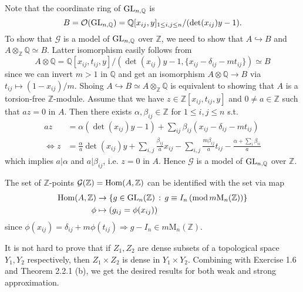 \begin{problem} \notfinish
\end{problem}
\begin{problem} \notfinish
\end{problem}

\begin{problem}
Note that the coordinate ring of $\operatorname{\mathrm{GL}}_{n,\mathbb{Q}}$ is 
$$
B =\mathcal{O}(\operatorname{\mathrm{GL}}_{n, \mathbb{Q}}) = \mathbb{Q}[x_{ij}, y]_{1\leq i,j \leq n} / (\det(x_{ij})y - 1).
$$
To show that $\mathcal{G}$ is a model of $\operatorname{\mathrm{GL}}_{n, \mathbb{Q}}$ over $\mathbb{Z}$, we need to show that
$A \hookrightarrow B$ and $A \otimes_{\mathbb{Z}} \mathbb{Q} \simeq B$.
Latter isomorphism easily follows from 
$$
A \otimes \mathbb{Q} = \mathbb{Q}[x_{ij}, t_{ij}, y] / (\det(x_{ij})y - 1, \{x_{ij} - \delta_{ij} - mt_{ij}\}) \simeq B
$$
since we can invert $m > 1$ in $\mathbb{Q}$ and get an isomorphism $A\otimes\mathbb{Q} \to B$ via $t_{ij} \mapsto (1 - x_{ij})/m$.
Shoing $A \hookrightarrow B \simeq A \otimes_{\mathbb{Z}}\mathbb{Q}$ is equivalent to
showing that $A$ is a torsion-free $\mathbb{Z}$-module.
Assume that we have $z\in \mathbb{Z}[x_{ij}, t_{ij}, y]$ and $0 \neq a\in\mathbb{Z}$
such that $az = 0$ in $A$.
Then there exists $\alpha, \beta_{ij} \in \mathbb{Z}$ for $1 \leq i, j \leq n$ s.t.
\begin{align*}
az &= \alpha(\det(x_{ij})y - 1) + \sum_{ij}\beta_{ij}(x_{ij} - \delta_{ij} - mt_{ij}) \\
\Leftrightarrow z &= \frac{\alpha}{a} \det(x_{ij})y + \sum_{i, j} \frac{\beta_{ij}}{a}x_{ij} - \sum_{i, j} \frac{m\beta_{ij}}{a}t_{ij} - \frac{\alpha + \sum_{i}\beta_{ii}}{a}
\end{align*}
which implies $a |\alpha$ and $a|\beta_{ij}$, i.e. $z = 0$ in $A$.
Hence $\mathcal{G}$ is a model of $\operatorname{\mathrm{GL}}_{n,\mathbb{Q}}$ over $\mathbb{Z}$.

The set of $\mathbb{Z}$-points $\mathcal{G}(\mathbb{Z}) = \operatorname{\mathrm{Hom}}(A, \mathbb{Z})$ can be identified with the set via map
\begin{align*}
\operatorname{\mathrm{Hom}}(A, \mathbb{Z}) &\to \{g \in \operatorname{\mathrm{GL}}_{n}(\mathbb{Z})\,:\,g \equiv I_{n} \,(\mathrm{mod}\, m \mathrm{M}_{n}(\mathbb{Z}))\} \\
\phi &\mapsto (g_{ij} = \phi(x_{ij}))
\end{align*}
since $\phi(x_{ij}) = \delta_{ij} + m\phi(t_{ij}) \Rightarrow g - I_{n} \in m\mathrm{M}_{n}(\mathbb{Z})$.
\end{problem}

\begin{problem} \notfinish
It is not hard to prove that if $Z_{1}, Z_{2}$ are dense subsets of a topological space $Y_{1}, Y_{2}$ respectively, then
$Z_{1} \times Z_{2}$ is dense in $Y_{1} \times Y_{2}$.
Combining with Exercise 1.6 and Theorem 2.2.1 (b), we get the desired results for both weak and strong approximation.

\end{problem}


